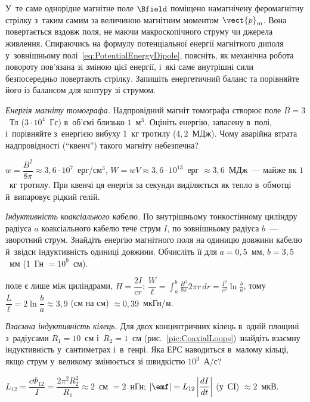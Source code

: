 \begin{problem}
	У~те саме однорідне магнітне поле \(\Bfield\) поміщено намагнічену феромагнітну
	стрілку з~таким самим за величиною магнітним моментом \(\vect{p}_m\). Вона
	повертається вздовж поля, не маючи макроскопічного струму чи джерела живлення.
	Спираючись на формулу потенціальної енергії магнітного диполя у~зовнішньому
	полі~\eqref{eq:PotentialEnergyDipole}, поясніть, як механічна робота повороту
	пов'язана зі зміною цієї енергії, і~які саме внутрішні сили безпосередньо повертають
	стрілку. Запишіть енергетичний баланс та порівняйте його із балансом для контуру зі
	струмом.
\end{problem}

\begin{problem}\label{prb:MRIEnergy}
	\emph{Енергія магніту томографа.} Надпровідний магніт томографа створює поле $B=3$~Тл ($3\cdot10^4$~Гс) в~об'ємі близько
	$1$~м$^3$. Оцініть енергію, запасену в~полі, і~порівняйте з~енергією вибуху $1$~кг тротилу ($4{,}2$~МДж). Чому аварійна втрата
	надпровідності (\enquote{квенч}) такого магніту небезпечна?
	\begin{solution}
		$w=\dfrac{B^2}{8\pi}\approx3{,}6\cdot10^{7}$~ерг/см$^3$, $W=wV\approx3{,}6\cdot10^{13}$~ерг $\approx3{,}6$~МДж~--- майже як $1$~кг тротилу. При квенчі ця енергія за секунди виділяється як тепло в~обмотці й~випаровує рідкий гелій.
	\end{solution}
\end{problem}

\begin{problem}\label{prb:CoaxInductance}
	\emph{Індуктивність коаксіального кабелю.} По внутрішньому тонкостінному циліндру радіуса $a$ коаксіального кабелю тече
	струм $I$, по зовнішньому радіуса $b$~--- зворотний струм. Знайдіть енергію магнітного поля на одиницю довжини кабелю й~звідси
	індуктивність одиниці довжини. Обчисліть її для $a=0{,}5$~мм, $b=3{,}5$~мм ($1$~Гн $=10^9$~см).
	\begin{solution}
		поле є лише між циліндрами, $H=\dfrac{2I}{cr}$; $\dfrac{W}{\ell}=\displaystyle\int_a^b\frac{H^2}{8\pi}2\pi r\,dr=\frac{I^2}{c^2}\ln\frac ba$, тому $\dfrac{L}{\ell}=2\ln\dfrac ba\approx3{,}9$ (см на см) $\approx0{,}39$~мкГн/м.
	\end{solution}
\end{problem}

\begin{problem}\label{prb:CoaxialRingsNumbers}
	\emph{Взаємна індуктивність кілець.} Для двох концентричних кілець в~одній площині з~радіусами $R_1=10$~см і~$R_2=1$~см
	(рис.~\ref{pic:CoaxialLoops}) знайдіть взаємну індуктивність у~сантиметрах і~в~генрі. Яка ЕРС наводиться в~малому кільці,
	якщо струм у~великому змінюється зі швидкістю $10^3$~А/с?
	\begin{solution}
		$L_{12}=\dfrac{c\Phi_{12}}{I}=\dfrac{2\pi^2R_2^2}{R_1}\approx2$~см $=2$~нГн; $|\emf|=L_{12}\left|\dfrac{dI}{dt}\right|$ (у~СІ) $\approx2$~мкВ.
	\end{solution}
\end{problem}

